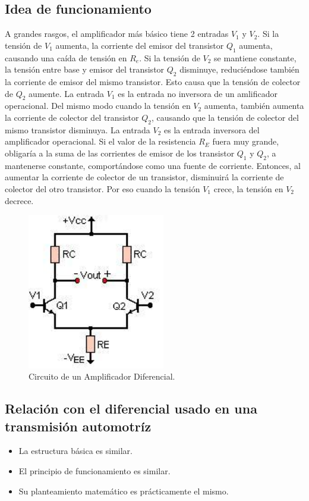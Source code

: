 \documentclass[letterpaper, 12pt]{article}
\begin{document}
\begin{justify}
        \subsection{Idea de funcionamiento}
        A grandes rasgos, el amplificador más básico tiene 2 entradas \(V_1\) y \(V_2\). Si la tensión de \(V_1\) aumenta, la corriente del emisor del transistor \(Q_1\) aumenta,
        causando una caída de tensión en \(R_e\). Si la tensión de \(V_2\) se mantiene constante, la tensión entre base y emisor del transistor \(Q_2\) disminuye, reduciéndose también la corriente
        de emisor del mismo transistor. Esto causa que la tensión de colector de \(Q_2\) aumente. La entrada \(V_1\) es la entrada no inversora de un amlificador operacional. Del mismo modo cuando la tensión
        en \(V_2\) aumenta, también aumenta la corriente de colector del transistor \(Q_2\), causando que la tensión de colector del mismo transistor disminuya. La entrada \(V_2\) es la entrada inversora del amplificador
        operacional. Si el valor de la resistencia \(R_E\) fuera muy grande, obligaría a la suma de las corrientes de emisor de los transistor \(Q_1\) y \(Q_2\), a mantenerse constante, comportándose como una fuente de corriente.
        Entonces, al aumentar la corriente de colector de un transistor, disminuirá la corriente de colector del otro transistor. Por eso cuando la tensión \(V_1\) crece, la tensión en \(V_2\) decrece.
        \begin{figure}[H]
            \centering
            \includegraphics[width=6cm]{dxamp.jpg}
            \caption{Circuito de un Amplificador Diferencial.}
            \label{fig:dxamp}
        \end{figure}
        \subsection{Relación con el diferencial usado en una transmisión automotríz}
        \begin{itemize}
            \item La estructura básica es similar.
            \item El principio de funcionamiento es similar.
            \item Su planteamiento matemático es prácticamente el mismo.
        \end{itemize}
    \end{justify}
     
    \newpage
    \printbibliography
\end{document}
